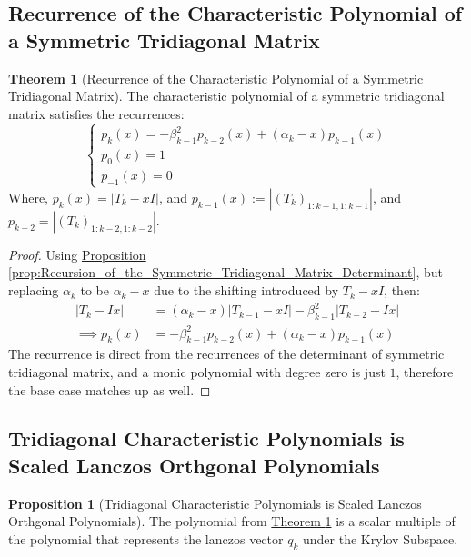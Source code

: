 \documentclass[]{article}
\theoremstyle{definition}
\newtheorem{theorem}{Theorem}            %
\newtheorem{prop}{Proposition}[section]  %
\begin{document}
\begin{appendices}
        \subsection{Recurrence of the Characteristic Polynomial of a Symmetric Tridiagonal Matrix}
            \begin{theorem}[Recurrence of the Characteristic Polynomial of a Symmetric Tridiagonal Matrix]
            \label{theorem:Recurrence_of_the_Characteristic_Polynomial_of_a_Symmetric_Tridiagonal_Matrix}
            The characteristic polynomial of a symmetric tridiagonal matrix satisfies the recurrences: 
            $$
            \begin{cases}
                p_k(x) = - \beta_{k - 1}^2 p_{k - 2}(x) + (\alpha_k - x)p_{k - 1}(x)
                \\
                p_0(x) = 1
                \\
                p_{-1}(x) = 0
            \end{cases}
            $$
            Where, $p_k(x) = |T_k - xI|$, and $p_{k - 1}(x) :=|(T_k)_{1:k - 1, 1:k - 1}|$, and $p_{k - 2} = |(T_k)_{1:k - 2, 1:k - 2}|$. 
            \end{theorem}
            \begin{proof}
                Using \hyperref[prop:Recursion_of_the_Symmetric_Tridiagonal_Matrix_Determinant]{Proposition \ref*{prop:Recursion_of_the_Symmetric_Tridiagonal_Matrix_Determinant}}, but replacing $\alpha_k$ to be $\alpha_k - x$ due to the shifting introduced by $T_k - xI$, then: 
                \begin{align}
                    |T_k - Ix| &= (\alpha_k - x)|T_{k - 1} - xI| -\beta_{k - 1}^2|T_{k - 2} - Ix|
                    \\
                    \implies
                    p_k(x) &= - \beta_{k - 1}^2 p_{k - 2}(x) + (\alpha_k - x)p_{k - 1}(x)
                \end{align}
                The recurrence is direct from the recurrences of the determinant of symmetric tridiagonal matrix, and a monic polynomial with degree zero is just $1$, therefore the base case matches up as well. 
            \end{proof}
        
        \subsection{Tridiagonal Characteristic Polynomials is Scaled Lanczos Orthgonal Polynomials}
            \begin{prop}[Tridiagonal Characteristic Polynomials is Scaled Lanczos Orthgonal Polynomials]
                The polynomial from \hyperref[theorem:Recurrence_of_the_Characteristic_Polynomial_of_a_Symmetric_Tridiagonal_Matrix]{Theorem \ref*{theorem:Recurrence_of_the_Characteristic_Polynomial_of_a_Symmetric_Tridiagonal_Matrix}} is a scalar multiple of the polynomial that represents the lanczos vector $q_k$ under the Krylov Subspace. 
            \end{prop}

\end{appendices}
\end{document}

